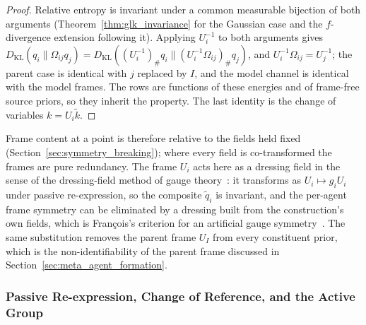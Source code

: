 \documentclass[11pt]{article}
\begin{document}
\begin{proof}
Relative entropy is invariant under a common measurable bijection of both arguments (Theorem~\ref{thm:glk_invariance} for the Gaussian case and the $f$-divergence extension following it). Applying $U_i^{-1}$ to both arguments gives $D_{\mathrm{KL}}(q_i \| \Omega_{ij} q_j) = D_{\mathrm{KL}}((U_i^{-1})_\# q_i \| (U_i^{-1}\Omega_{ij})_\# q_j)$, and $U_i^{-1}\Omega_{ij} = U_j^{-1}$; the parent case is identical with $j$ replaced by $I$, and the model channel is identical with the model frames. The rows are functions of these energies and of frame-free source priors, so they inherit the property. The last identity is the change of variables $k = U_i\tilde k$.
\end{proof}

Frame content at a point is therefore relative to the fields held fixed (Section~\ref{sec:symmetry_breaking}); where every field is co-transformed the frames are pure redundancy. The frame $U_i$ acts here as a dressing field in the sense of the dressing-field method of gauge theory~\cite{Fournel2014Dressing}: it transforms as $U_i \mapsto g_iU_i$ under passive re-expression, so the composite $\tilde q_i$ is invariant, and the per-agent frame symmetry can be eliminated by a dressing built from the construction's own fields, which is Fran\c{c}ois's criterion for an artificial gauge symmetry~\cite{Francois2019Artificial}. The same substitution removes the parent frame $U_I$ from every constituent prior, which is the non-identifiability of the parent frame discussed in Section~\ref{sec:meta_agent_formation}.

\subsubsection{Passive Re-expression, Change of Reference, and the Active Group}
\label{sec:gauge_covariance_principle}
\end{document}
